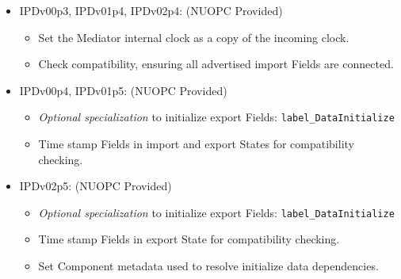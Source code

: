 \begin{itemize}
\begin{itemize}
\begin{itemize}
\begin{itemize}
      \end{itemize}
    \end{itemize}  
  \end{itemize}  
\item IPDv00p3, IPDv01p4, IPDv02p4: ({\sc NUOPC Provided})
  \begin{itemize}
  \item Set the Mediator internal clock as a copy of the incoming clock. 
  \item Check compatibility, ensuring all advertised import Fields are connected.
  \end{itemize}  
\item IPDv00p4, IPDv01p5: ({\sc NUOPC Provided})
  \begin{itemize}
  \item {\it Optional specialization} to initialize export Fields: {\tt label\_DataInitialize}
  \item Time stamp Fields in import and export States for compatibility checking.
  \end{itemize}    
\item IPDv02p5: ({\sc NUOPC Provided})
  \begin{itemize}
  \item {\it Optional specialization} to initialize export Fields: {\tt label\_DataInitialize}
  \item Time stamp Fields in export State for compatibility checking.
  \item Set Component metadata used to resolve initialize data dependencies.
  \end{itemize}    
\end{itemize}

